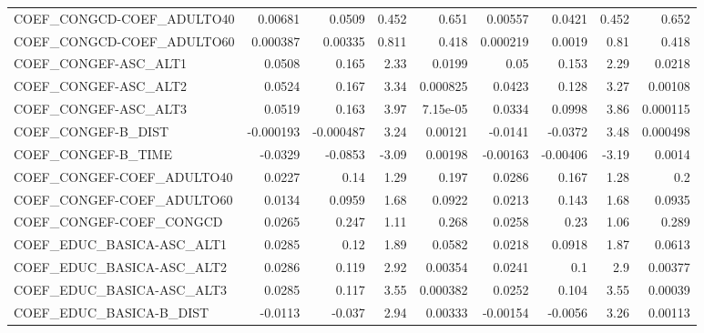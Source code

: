 \begin{tabular}{lrrrrrrrr}
COEF\_CONGCD-COEF\_ADULTO40         &     0.00681 &       0.0509 &    0.452 &    0.651 &    0.00557 &      0.0421 &        0.452 &         0.652 \\
COEF\_CONGCD-COEF\_ADULTO60         &    0.000387 &      0.00335 &    0.811 &    0.418 &   0.000219 &      0.0019 &         0.81 &         0.418 \\
COEF\_CONGEF-ASC\_ALT1              &      0.0508 &        0.165 &     2.33 &   0.0199 &       0.05 &       0.153 &         2.29 &        0.0218 \\
COEF\_CONGEF-ASC\_ALT2              &      0.0524 &        0.167 &     3.34 & 0.000825 &     0.0423 &       0.128 &         3.27 &       0.00108 \\
COEF\_CONGEF-ASC\_ALT3              &      0.0519 &        0.163 &     3.97 & 7.15e-05 &     0.0334 &      0.0998 &         3.86 &      0.000115 \\
COEF\_CONGEF-B\_DIST                &   -0.000193 &    -0.000487 &     3.24 &  0.00121 &    -0.0141 &     -0.0372 &         3.48 &      0.000498 \\
COEF\_CONGEF-B\_TIME                &     -0.0329 &      -0.0853 &    -3.09 &  0.00198 &   -0.00163 &    -0.00406 &        -3.19 &        0.0014 \\
COEF\_CONGEF-COEF\_ADULTO40         &      0.0227 &         0.14 &     1.29 &    0.197 &     0.0286 &       0.167 &         1.28 &           0.2 \\
COEF\_CONGEF-COEF\_ADULTO60         &      0.0134 &       0.0959 &     1.68 &   0.0922 &     0.0213 &       0.143 &         1.68 &        0.0935 \\
COEF\_CONGEF-COEF\_CONGCD           &      0.0265 &        0.247 &     1.11 &    0.268 &     0.0258 &        0.23 &         1.06 &         0.289 \\
COEF\_EDUC\_BASICA-ASC\_ALT1         &      0.0285 &         0.12 &     1.89 &   0.0582 &     0.0218 &      0.0918 &         1.87 &        0.0613 \\
COEF\_EDUC\_BASICA-ASC\_ALT2         &      0.0286 &        0.119 &     2.92 &  0.00354 &     0.0241 &         0.1 &          2.9 &       0.00377 \\
COEF\_EDUC\_BASICA-ASC\_ALT3         &      0.0285 &        0.117 &     3.55 & 0.000382 &     0.0252 &       0.104 &         3.55 &       0.00039 \\
COEF\_EDUC\_BASICA-B\_DIST           &     -0.0113 &       -0.037 &     2.94 &  0.00333 &   -0.00154 &     -0.0056 &         3.26 &       0.00113 \\

\end{tabular}
